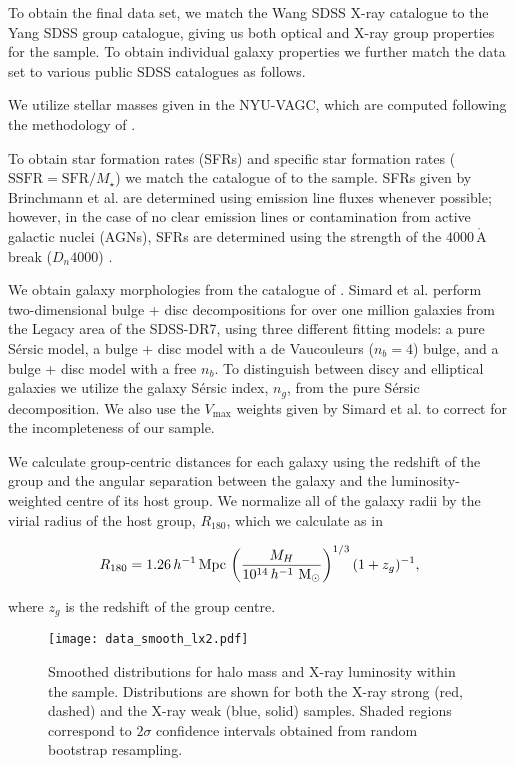 To obtain the final data set, we match the Wang SDSS X-ray catalogue
to the Yang SDSS group catalogue, giving us both optical and X-ray
group properties for the sample.  To obtain individual galaxy
properties we further match the data set to various public SDSS
catalogues as follows.
\par
We utilize stellar masses given in the NYU-VAGC, which are computed
following the methodology of \citet{blanton2007}.
\par
To obtain star formation rates (SFRs) and specific star formation
rates ($\mathrm{SSFR} = \mathrm{SFR} / M_\star$) we match the
catalogue of \citet{brinchmann2004} to the sample.  SFRs given by
Brinchmann et al. are determined using emission line fluxes whenever
possible; however, in the case of no clear emission lines or
contamination from active galactic nuclei (AGNs), SFRs are determined
using the strength of the $4000\,\mathrm{\mathring{A}}$ break
($D_n4000$) \citep{brinchmann2004}.
\par
We obtain galaxy morphologies from the catalogue of
\citet{simard2011}.  Simard et al. perform two-dimensional bulge +
disc decompositions for over one million galaxies from the Legacy area
of the SDSS-DR7, using three different fitting models: a pure
S{\'e}rsic model, a bulge + disc model with a de Vaucouleurs ($n_b =
4$) bulge, and a bulge + disc model with a free $n_b$.  To distinguish
between discy and elliptical galaxies we utilize the galaxy S{\'e}rsic
index, $n_g$, from the pure S{\'e}rsic decomposition.  We also use the
$V_\mathrm{max}$ weights given by Simard et al. to correct for the
incompleteness of our sample.
\par
We calculate group-centric distances for each galaxy using the
redshift of the group and the angular separation between the galaxy
and the luminosity-weighted centre of its host group.  We normalize
all of the galaxy radii by the virial radius of the host group,
$R_{180}$, which we calculate as in \citet{yang2007}

\begin{equation}
  R_{180} =
  1.26\,h^{-1}\,\mathrm{Mpc}\,\left(\frac{M_H}{10^{14}\,h^{-1}\,\,\mathrm{M_{\odot}}}
  \right )^{1/3} (1 + z_g)^{-1},
\end{equation}

\noindent
where $z_g$ is the redshift of the group centre.

\begin{figure}[!tp]
  \centering
  \texttt{[image: data\_smooth\_lx2.pdf]}
  \caption[X-ray luminosity and halo mass distributions]{Smoothed
    distributions for halo mass and X-ray luminosity 
    within the sample.  Distributions are shown for both the X-ray
    strong (red, dashed) and the X-ray weak (blue, solid) samples.
    Shaded regions correspond to $2\sigma$ confidence intervals
    obtained from random bootstrap resampling.}
  \label{fig:data_smooth_lx2}
\end{figure} 


